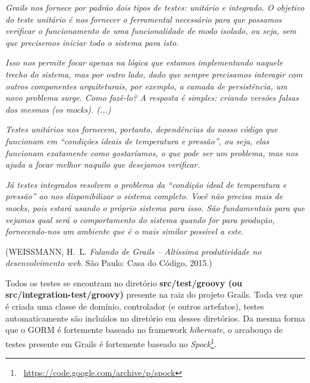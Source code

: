 \begin{cBox}
{\it Grails nos  fornece por padrão dois tipos de  testes: unitário e integrado.
  O objetivo do teste unitário é  nos fornecer o ferramental necessário para que
  possamos verificar o  funcionamento de uma funcionalidade de  modo isolado, ou
  seja, sem que precisemos iniciar todo o sistema para isto.} 

\vspace{0.2cm}

{\it Isso nos  permite focar apenas na lógica  que estamos implementando naquele
  trecho do  sistema, mas por outro  lado, dado que  sempre precisamos interagir
  com outros  componentes arquiteturais, por exemplo, a  camada de persistência,
  um novo  problema surge. Como fazê-lo?  A resposta é  simples: criando versões
  falsas dos mesmos (os mocks). (...)}

\vspace{0.2cm}

{\it Testes unitários  nos fornecem, portanto, dependências do  nosso código que
  funcionam  em ``condições  ideais de  temperatura e  pressão'', ou  seja, elas
  funcionam exatamente  como gostaríamos,  o que pode  ser um problema,  mas nos
  ajuda a focar melhor naquilo que desejamos verificar.}

\vspace{0.2cm}
 
{\it Já testes integrados resolvem o problema da ``condição ideal de temperatura
  e pressão'' ao nos disponibilizar o sistema completo. Você não precisa mais de
  mocks, pois estará  usando o próprio sistema para  isso. São fundamentais para
  que vejamos  qual será  o comportamento do  sistema quando for  para produção,
  fornecendo-nos um ambiente que é o mais similar possível a este.}

\vspace{0.2cm}

\noindent ({WEISSMANN, H.~L. \emph{Falando  de Grails -- Altíssima produtividade
    no desenvolvimento web}. São Paulo: Casa do Código, 2015.)} 
\end{cBox}

\vspace{0.5cm}

Todos   os  testes   se  encontram   no  diretório   {\bf   src/test/groovy  (ou
  src/integration-test/groovy)} presente na raiz do projeto Grails. Toda vez que
é  criada  uma classe  de  domínio,  controlador  (e outros  artefatos),  testes
automaticamente são incluídos no diretório em desses diretórios.  Da mesma forma
que o  GORM é fortemente  baseado no framework  {\it hibernate}, o  arcabouço de
testes    presente     em    Grails    é    fortemente     baseado    no    {\it
  Spock}\footnote{~\url{https://code.google.com/archive/p/spock}}.  

